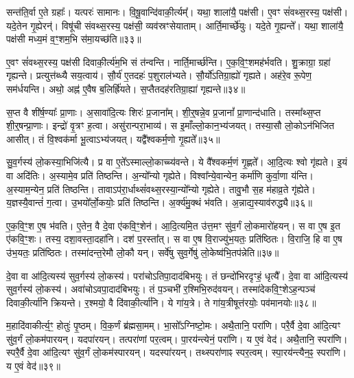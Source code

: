 सन्त॑ति॒र्वा ए॒ते ग्रहाः᳚।
यत्परः॑ सामानः।
वि॒षू॒वान्दि॑वा\-की॒र्त्यम्᳚।
यथा॒ शाला॑यै॒ पक्ष॑सी।
ए॒वꣳ सं॑वथ्स॒रस्य॒ पक्ष॑सी।
यदे॒तेन गृ॒ह्येरन्॑।
विषू॑ची संवथ्स॒रस्य॒ पक्ष॑सी॒ व्यव॑स्रꣳसेयाताम्।
आर्ति॒मार्च्छे॑युः।
यदे॒ते गृ॒ह्यन्ते᳚।
यथा॒ शाला॑यै॒ पक्ष॑सी मध्य॒मं व॒ꣳ॒शम॒भि स॑मा॒यच्छ॑ति॥३३॥

ए॒वꣳ सं॑वथ्स॒रस्य॒ पक्ष॑सी दिवाकी॒र्त्य॑म॒भि सं त॑न्वन्ति।
नार्ति॒मार्च्छ॑न्ति।
ए॒क॒वि॒ꣳ॒शमह॑र्भवति।
शु॒क्राग्रा॒ ग्रहा॑ गृह्यन्ते।
प्रत्युत्त॑ब्ध्यै सय॒त्वाय॑।
सौ॒र्य॑ ए॒तदहः॑ प॒शुराल॑भ्यते।
सौ॒र्यो॑\-ऽतिग्रा॒ह्यो॑ गृह्यते।
अह॑रे॒व रू॒पेण॒ सम॑र्धयन्ति।
अथो॒ अह्न॑ ए॒वैष ब॒लिर्\mbox{}ह्रि॑यते।
स॒प्तैतदह॑रतिग्रा॒ह्या॑ गृह्यन्ते॥३४॥

स॒प्त वै शी॑र्\mbox{}ष॒ण्याः᳚ प्रा॒णाः।
अ॒सावा॑दि॒त्यः शिरः॑ प्र॒जाना᳚म्।
शी॒र्॒षन्ने॒व प्र॒जानां᳚ प्रा॒णान्द॑धाति।
तस्मा᳚थ्स॒प्त शी॒र्॒षन्प्रा॒णाः।
इन्द्रो॑ वृ॒त्रꣳ ह॒त्वा।
असु॑रान्परा॒भाव्य॑।
स इ॒माँल्लो॒कान॒भ्य॑जयत्।
तस्या॒सौ लो॒को\-ऽन॑भिजित आसीत्।
तं वि॒श्वक॑र्मा भू॒त्वा\-ऽभ्य॑जयत्।
यद्वै᳚श्वकर्म॒णो गृ॒ह्यते᳚॥३५॥

सु॒व॒र्गस्य॑ लो॒कस्या॒भिजि॑त्यै।
प्र वा ए॒ते᳚\-ऽस्माल्लो॒काच्च्य॑वन्ते।
ये वै᳚श्वकर्म॒णं गृ॒ह्णते᳚।
आ॒दि॒त्यः श्वो गृ॑ह्यते।
इ॒यं वा अदि॑तिः।
अ॒स्यामे॒व प्रति॑ तिष्ठन्ति।
अ॒न्यो᳚न्यो गृह्येते।
विश्वा᳚न्ये॒वान्येन॒ कर्मा॑णि कुर्वा॒णा य॑न्ति।
अ॒स्याम॒न्येन॒ प्रति॑ तिष्ठन्ति।
तावाऽप॑रा॒र्धाथ्सं॑वथ्स॒रस्या॒न्यो᳚न्यो गृह्येते।
तावु॒भौ स॒ह म॑हाव्र॒ते गृ॑ह्येते।
य॒ज्ञस्यै॒वान्तं॑ ग॒त्वा।
उ॒भयो᳚र्लो॒कयोः॒ प्रति॑ तिष्ठन्ति।
अ॒र्क्य॑मु॒क्थं भ॑वति।
अ॒न्नाद्य॒स्याव॑रुद्ध्यै॥३६॥\anuvakamend[स॒मा॒यच्छ॑त्यतिग्रा॒ह्या॑ गृह्यन्ते गृ॒ह्यते॑ संवथ्स॒रस्या॒न्यो᳚न्यो गृह्येते॒ पञ्च॑ च]

ए॒क॒वि॒ꣳ॒श ए॒ष भ॑वति।
ए॒तेन॒ वै दे॒वा ए॑कवि॒ꣳ॒शेन॑।
आ॒दि॒त्यमि॒त उ॑त्त॒मꣳ सु॑व॒र्गं लो॒कमारो॑हयन्।
स वा ए॒ष इ॒त ए॑कवि॒ꣳ॒शः।
तस्य॒ दशा॒वस्ता॒दहा॑नि।
दश॑ प॒रस्ता᳚त्।
स वा ए॒ष वि॒राज्यु॑भ॒यतः॒ प्रति॑\-ष्ठितः।
वि॒राजि॒ हि वा ए॒ष उ॑भ॒यतः॒ प्रति॑\-ष्ठितः।
तस्मा॑दन्त॒रेमौ लो॒कौ यन्।
सर्वे॑षु सुव॒र्गेषु॑ लो॒केष्व॑भि॒तप॑न्नेति॥३७॥

दे॒वा वा आ॑दि॒त्यस्य॑ सुव॒र्गस्य॑ लो॒कस्य॑।
परा॑चो\-ऽतिपा॒दा\-द॑बिभयुः।
तं छन्दो॑भिरदृꣳहं॒ धृत्यै᳚।
दे॒वा वा आ॑दि॒त्यस्य॑ सुव॒र्गस्य॑ लो॒कस्य॑।
अवा॑चो\-ऽवपा॒दाद॑बिभयुः।
तं प॒ञ्चभी॑ र॒श्मिभि॒रुद॑वयन्।
तस्मा॑देकवि॒ꣳ॒शे\-ऽह॒न्पञ्च॑ दिवाकी॒र्त्या॑नि क्रियन्ते।
र॒श्मयो॒ वै दि॑वाकी॒र्त्या॑नि।
ये गा॑य॒त्रे।
ते गा॑य॒त्रीषूत्त॑रयोः॒ पव॑मानयोः॥३८॥

म॒हादि॑वाकीर्त्य॒ꣳ॒ होतुः॑ पृ॒ष्ठम्।
वि॒क॒र्णं ब्र॑ह्मसा॒मम्।
भा॒सो᳚\-ऽग्निष्टो॒मः।
अथै॒तानि॒ परा॑णि।
परै॒र्वै दे॒वा आ॑दि॒त्यꣳ सु॑व॒र्गं लो॒कम॑पारयन्।
यदपा॑रयन्।
तत्परा॑णां पर॒त्वम्।
पा॒रय॑न्त्येनं॒ परा॑णि।
य ए॒वं वेद॑।
अथै॒तानि॒ स्परा॑णि।
स्परै॒र्वै दे॒वा आ॑दि॒त्यꣳ सु॑व॒र्गं लो॒कम॑स्पारयन्।
यदस्पा॑रयन्।
तथ्स्परा॑णाꣴ स्पर॒त्वम्।
स्पा॒रय॑न्त्यैन॒ꣴ॒ स्परा॑णि।
य ए॒वं वेद॑॥३९॥\anuvakamend[ए॒ति॒ पव॑मानयोः॒ स्परा॑णि॒ पञ्च॑ च]

